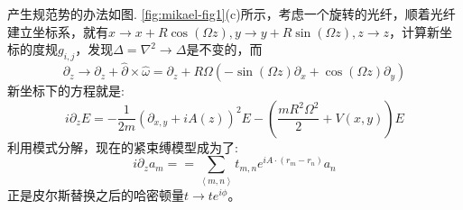 \documentclass[supercite]{HustGraduPaper}
\newcommand{\avg}[1]{\left\langle #1 \right\rangle}
\begin{document}
产生规范势的办法如图. \ref{fig:mikael-fig1}(c)所示，考虑一个旋转的光纤，顺着光纤建立坐标系，就有$x \to x+ R\cos(\Omega z), y \to y+ R\sin(\Omega z), z \to z$，计算新坐标的度规$g_{i,j}$，发现$\Delta = \nabla^2 \to \Delta$是不变的，而
\begin{equation}
\partial_z \to \partial_z + \hat{\partial}\times \hat \omega = \partial_z + R\Omega(-\sin(\Omega z) \partial_{x} + \cos(\Omega z) \partial_{y})
\end{equation}
新坐标下的方程就是:
\begin{equation}
	i\partial_z E = - \frac{1}{2m} (\partial_{x,y} + iA(z))^2 E - (\frac{mR^2\Omega^2}{2} + V(x,y) )E
\end{equation}
利用模式分解，现在的紧束缚模型成为了:
\begin{equation}
i \partial_z a_m = =\sum_{\avg{m,n}} t_{m,n} e^{i A \cdot (r_m - r_n)} a_n
\end{equation}
正是皮尔斯替换之后的哈密顿量$t \to te^{i \phi}$。
\end{document}
